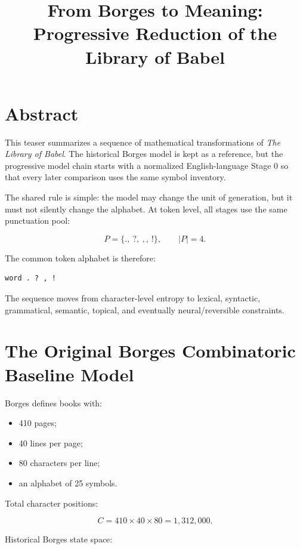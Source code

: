 \documentclass[11pt,a4paper]{article}
\title{From Borges to Meaning: Progressive Reduction of the Library of Babel}
\author{}
\date{}
\begin{document}
\maketitle
\tableofcontents
\newpage

\section*{Abstract}

This teaser summarizes a sequence of mathematical transformations of \emph{The Library of Babel}. The historical Borges model is kept as a reference, but the progressive model chain starts with a normalized English-language Stage 0 so that every later comparison uses the same symbol inventory.

The shared rule is simple: the model may change the unit of generation, but it must not silently change the alphabet. At token level, all stages use the same punctuation pool:

\[
P = \{\mathtt{.},\ \mathtt{?},\ \mathtt{,},\ \mathtt{!}\}, \qquad |P| = 4.
\]

The common token alphabet is therefore:

\begin{lstlisting}[style=textstyle]
word . ? , !
\end{lstlisting}

The sequence moves from character-level entropy to lexical, syntactic, grammatical, semantic, topical, and eventually neural/reversible constraints.

\section{The Original Borges Combinatoric Baseline Model}

Borges defines books with:

\begin{itemize}
  \item 410 pages;
  \item 40 lines per page;
  \item 80 characters per line;
  \item an alphabet of 25 symbols.
\end{itemize}

Total character positions:

\[
C = 410 \times 40 \times 80 = 1{,}312{,}000.
\]

Historical Borges state space:
\end{document}
